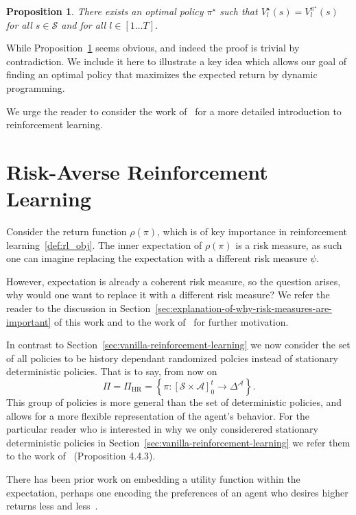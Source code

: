 \documentclass[10pt]{article}
\renewcommand{\cite}{\citep}
\theoremstyle{plain}
\newtheorem{proposition}{Proposition}
\theoremstyle{remark}
\begin{document}
\begin{proposition}\label{prop:optimal_policy_value}
        There exists an optimal policy $\pi^\star$ such that $V^\star_l(s) = V^{\pi^\star}_l(s)$ for all $s \in \mathcal{S}$ and for all $l \in [1\ldots T]$.
\end{proposition}

While Proposition~\ref{prop:optimal_policy_value} seems obvious, and indeed the proof is trivial by contradiction. We include it here to illustrate a key idea which allows our goal of finding an optimal policy that maximizes the expected return by dynamic programming.

We urge the reader to consider the work of~\cite{sutton2018} for a more detailed introduction to reinforcement learning.

\section{Risk-Averse Reinforcement Learning}

Consider the return function $\rho(\pi)$, which is of key importance in reinforcement learning~\ref{def:rl_obj}. 
The inner expectation of $\rho(\pi)$ is a risk measure, as such one can imagine replacing the expectation
with a different risk measure $\psi$.

However, expectation is already a coherent risk measure, so the question arises, why would one want to replace it with a different risk measure? 
We refer the reader to the discussion in Section~\ref{sec:explanation-of-why-risk-measures-are-important} of this
work and to the work of~\cite{Bauerle2011, follmer2016, howard1972} for further motivation. 

In contrast to Section~\ref{sec:vanilla-reinforcement-learning} we now consider the set of all policies to be history dependant randomized polcies instead of stationary deterministic policies. That is to say, from now on 
\[ 
        \Pi = \Pi_{\text{HR}} = \left\{ \pi : {[\mathcal{S} \times \mathcal{A}]}_{0}^{t} \to \Delta^\mathcal{A} \right\}.
\]
This group of policies is more general than the set of deterministic policies, and allows for a more flexible representation of the agent's behavior.
For the particular reader who is interested in why we only considerered stationary deterministic policies in Section~\ref{sec:vanilla-reinforcement-learning} we refer them to the work of~\cite{Puterman1994} (Proposition 4.4.3).

There has been prior work on embedding a utility function within the expectation, perhaps one encoding the preferences of an agent who
desires higher returns less and less~\cite{howard1972}. 
\end{document}
